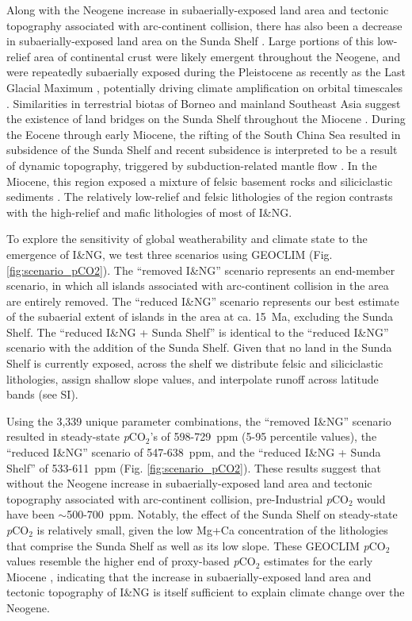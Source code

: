 \documentclass[11pt,letterpaper]{article}
\newcommand{\pCOtwo}{\textit{p}CO$_{2}$\xspace}
\begin{document}
Along with the Neogene increase in subaerially-exposed land area and tectonic topography associated with arc-continent collision, there has also been a decrease in subaerially-exposed land area on the Sunda Shelf \citep{Sarr2019a}. Large portions of this low-relief area of continental crust were likely emergent throughout the Neogene, and were repeatedly subaerially exposed during the Pleistocene as recently as the Last Glacial Maximum \citep{Hall2002a}, potentially driving climate amplification on orbital timescales \citep{DiNezio2018a}. Similarities in terrestrial biotas of Borneo and mainland Southeast Asia suggest the existence of land bridges on the Sunda Shelf throughout the Miocene \citep{Moss1998a}. During the Eocene through early Miocene, the rifting of the South China Sea resulted in subsidence of the Sunda Shelf \citep{Morley2013a} and recent subsidence is interpreted to be a result of dynamic topography, triggered by subduction-related mantle flow \citep{Sarr2019a}. In the Miocene, this region exposed a mixture of felsic basement rocks and siliciclastic sediments \citet{Darmadi2007a}. The relatively low-relief and felsic lithologies of the region contrasts with the high-relief and mafic lithologies of most of I\&NG.

To explore the sensitivity of global weatherability and climate state to the emergence of I\&NG, we test three scenarios using GEOCLIM (Fig. \ref{fig:scenario_pCO2}). The ``removed I\&NG'' scenario represents an end-member scenario, in which all islands associated with arc-continent collision in the area are entirely removed. The ``reduced I\&NG'' scenario represents our best estimate of the subaerial extent of islands in the area at ca. 15~Ma, excluding the Sunda Shelf. The ``reduced I\&NG + Sunda Shelf'' is identical to the ``reduced I\&NG'' scenario with the addition of the Sunda Shelf. Given that no land in the Sunda Shelf is currently exposed, across the shelf we distribute felsic and siliciclastic lithologies, assign shallow slope values, and interpolate runoff across latitude bands (see SI).

Using the 3,339 unique parameter combinations, the ``removed I\&NG'' scenario resulted in steady-state \pCOtwo's of 598-729~ppm (5-95 percentile values), the ``reduced I\&NG'' scenario of 547-638~ppm, and the ``reduced I\&NG + Sunda Shelf'' of 533-611~ppm (Fig. \ref{fig:scenario_pCO2}). These results suggest that without the Neogene increase in subaerially-exposed land area and tectonic topography associated with arc-continent collision, pre-Industrial \pCOtwo would have been $\sim$500-700~ppm. Notably, the effect of the Sunda Shelf on steady-state \pCOtwo is relatively small, given the low Mg+Ca concentration of the lithologies that comprise the Sunda Shelf as well as its low slope. These GEOCLIM \pCOtwo values resemble the higher end of proxy-based \pCOtwo estimates for the early Miocene \citep{Foster2017a}, indicating that the increase in subaerially-exposed land area and tectonic topography of I\&NG is itself sufficient to explain climate change over the Neogene.
\end{document}

